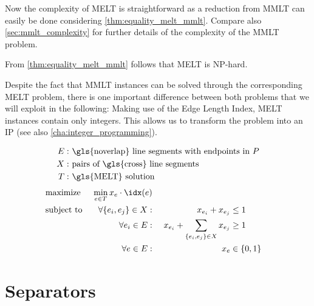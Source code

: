 Now the complexity of \gls{MELT} is straightforward as a reduction
from \gls{MMLT} can easily be done considering
\cref{thm:equality_melt_mmlt}. Compare also \cref{sec:mmlt_complexity}
for further details of the complexity of the \gls{MMLT} problem.

\begin{theorem}
  From \cref{thm:equality_melt_mmlt} follows
  that \gls{MELT} is NP-hard.
\end{theorem}

Despite the fact that \gls{MMLT} instances can be solved through the
corresponding \gls{MELT} problem, there is one important difference
between both problems that we will exploit in the following: Making
use of the Edge Length Index, \gls{MELT} instances contain only
integers. This allows us to transform the problem into an \gls{IP}
(see also \cref{cha:integer_programming}).

\begin{problem}
  \hfill
  \begin{alignat*}{1}
    E: &~ \text{\gls{noverlap} line segments with endpoints in \(P\)} \\
    X: &~ \text{pairs of \gls{cross} line segments} \\
    T: &~ \text{\gls{MELT} solution}
  \end{alignat*}
  \begin{alignat*}{3}
    &\text{maximize } & \min\limits_{e \in T} x_e \cdot \idx(e) \\
    &\text{subject to } & \forall \{e_i,e_j\} \in X : &~& x_{e_i} + x_{e_j} &\leq 1 \\
    && \forall e_i \in E : &~
      & x_{e_i} + \sum\limits_{\{e_i, e_j\} \in X} x_{e_j} &\geq 1 \\
    && \forall e \in E : &~& x_e &\in \{0,1\}
  \end{alignat*}
\end{problem}


\section{Separators}

